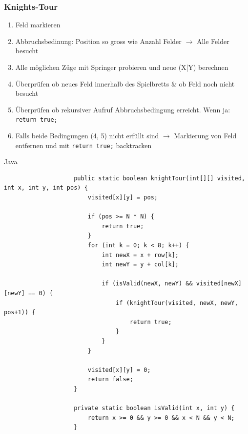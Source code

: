 \documentclass[a4paper, landscape, 8pt]{scrartcl}
\begin{document}
\begin{multicols*}{4}
                \subsubsection{Knights-Tour}
                    \begin{enumerate}
                        \item Feld markieren
                        \item Abbruchsbedinung: Position so gross wie Anzahl Felder $\to$ Alle Felder besucht
                        \item Alle möglichen Züge mit Springer probieren und neue (X|Y) berechnen
                        \item Überprüfen ob neues Feld innerhalb des Spielbretts \& ob Feld noch nicht besucht
                        \item Überprüfen ob rekursiver Aufruf Abbruchsbedingung erreicht. Wenn ja: \texttt{return true;}
                        \item Falls beide Bedingungen (4, 5) nicht erfüllt sind $\to$ Markierung von Feld entfernen
                        und mit \texttt{return true;} backtracken
                    \end{enumerate}
                    \textcolor{subsectioncolor}{Java}
                    \begin{lstlisting}
                    public static boolean knightTour(int[][] visited, int x, int y, int pos) {
                        visited[x][y] = pos;

                        if (pos >= N * N) {
                            return true;
                        }
                        for (int k = 0; k < 8; k++) {
                            int newX = x + row[k];
                            int newY = y + col[k];

                            if (isValid(newX, newY) && visited[newX][newY] == 0) {
                                if (knightTour(visited, newX, newY, pos+1)) {
                                    return true;
                                }
                            }
                        }

                        visited[x][y] = 0;
                        return false;
                    }

                    private static boolean isValid(int x, int y) {
                        return x >= 0 && y >= 0 && x < N && y < N;
                    }
                    \end{lstlisting}


\end{multicols*}
\end{document}
